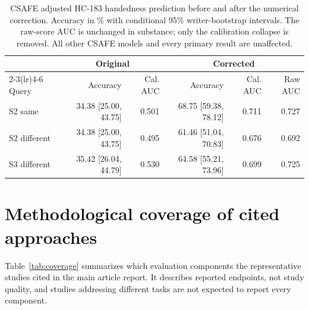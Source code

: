 \documentclass[10pt,a4paper]{article}
\begin{document}
\begin{table}[ht]
\caption{CSAFE adjusted HC-183 handedness prediction before and after the numerical correction. Accuracy in \% with conditional 95\% writer-bootstrap intervals. The raw-score AUC is unchanged in substance; only the calibration collapse is removed. All other CSAFE models and every primary result are unaffected.}\label{tab:correction}
\centering\footnotesize
\begin{tabular}{lrrrrr}\toprule
 & \multicolumn{2}{c}{Original} & \multicolumn{3}{c}{Corrected}\\\cmidrule(lr){2-3}\cmidrule(lr){4-6}
Query & Accuracy & Cal. AUC & Accuracy & Cal. AUC & Raw AUC\\\midrule
S2 same & 34.38 [25.00, 43.75] & 0.501 & 68.75 [59.38, 78.12] & 0.711 & 0.727 \\
S2 different & 34.38 [25.00, 43.75] & 0.495 & 61.46 [51.04, 70.83] & 0.676 & 0.692 \\
S3 different & 35.42 [26.04, 44.79] & 0.530 & 64.58 [55.21, 73.96] & 0.699 & 0.725 \\
\bottomrule
\end{tabular}
\end{table}

\FloatBarrier
\section{Methodological coverage of cited approaches}
\label{sec:supcoverage}
Table~\ref{tab:coverage} summarizes which evaluation components the representative studies cited in the main article report. It describes reported endpoints, not study quality, and studies addressing different tasks are not expected to report every component.
\end{document}

